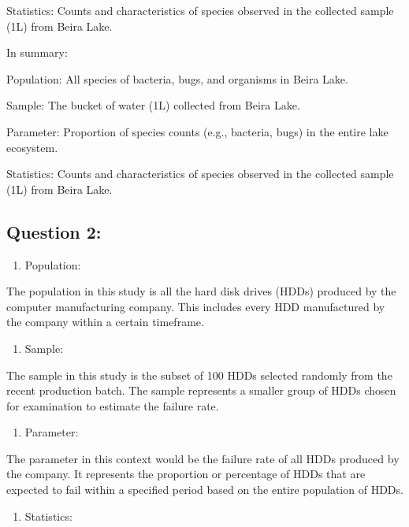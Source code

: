 \documentclass[
]{article}
\providecommand{\tightlist}{%
  \setlength{\itemsep}{0pt}\setlength{\parskip}{0pt}}
\begin{document}
Statistics: Counts and characteristics of species observed in the
collected sample (1L) from Beira Lake.

In summary:

Population: All species of bacteria, bugs, and organisms in Beira Lake.

Sample: The bucket of water (1L) collected from Beira Lake.

Parameter: Proportion of species counts (e.g., bacteria, bugs) in the
entire lake ecosystem.

Statistics: Counts and characteristics of species observed in the
collected sample (1L) from Beira Lake.

\subsection{Question 2:}\label{question-2}

\begin{enumerate}
\def\labelenumi{\roman{enumi}.}
\tightlist
\item
  Population:
\end{enumerate}

The population in this study is all the hard disk drives (HDDs) produced
by the computer manufacturing company. This includes every HDD
manufactured by the company within a certain timeframe.

\begin{enumerate}
\def\labelenumi{\roman{enumi}.}
\setcounter{enumi}{1}
\tightlist
\item
  Sample:
\end{enumerate}

The sample in this study is the subset of 100 HDDs selected randomly
from the recent production batch. The sample represents a smaller group
of HDDs chosen for examination to estimate the failure rate.

\begin{enumerate}
\def\labelenumi{\roman{enumi}.}
\setcounter{enumi}{2}
\tightlist
\item
  Parameter:
\end{enumerate}

The parameter in this context would be the failure rate of all HDDs
produced by the company. It represents the proportion or percentage of
HDDs that are expected to fail within a specified period based on the
entire population of HDDs.

\begin{enumerate}
\def\labelenumi{\roman{enumi}.}
\setcounter{enumi}{3}
\tightlist
\item
  Statistics:
\end{enumerate}
\end{document}
